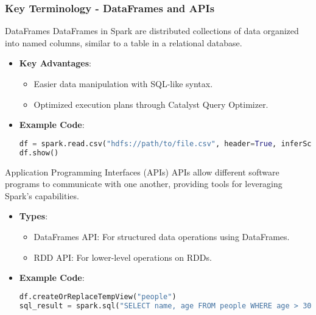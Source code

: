 \documentclass[aspectratio=169]{beamer}
\begin{document}
\begin{frame}[fragile]
    \frametitle{Key Terminology - DataFrames and APIs}
    \begin{block}{DataFrames}
        DataFrames in Spark are distributed collections of data organized into named columns, similar to a table in a relational database.
    \end{block}
    \pause
    \begin{itemize}
        \item \textbf{Key Advantages}:
        \begin{itemize}
            \item Easier data manipulation with SQL-like syntax.
            \item Optimized execution plans through Catalyst Query Optimizer.
        \end{itemize}
        \item \textbf{Example Code}:
        \begin{lstlisting}[language=Python]
df = spark.read.csv("hdfs://path/to/file.csv", header=True, inferSchema=True)
df.show()
        \end{lstlisting}
    \end{itemize}

    \begin{block}{Application Programming Interfaces (APIs)}
        APIs allow different software programs to communicate with one another, providing tools for leveraging Spark's capabilities.
    \end{block}
    \begin{itemize}
        \item \textbf{Types}:
        \begin{itemize}
            \item DataFrames API: For structured data operations using DataFrames.
            \item RDD API: For lower-level operations on RDDs.
        \end{itemize}
        \item \textbf{Example Code}:
        \begin{lstlisting}[language=Python]
df.createOrReplaceTempView("people")
sql_result = spark.sql("SELECT name, age FROM people WHERE age > 30")
        \end{lstlisting}
    \end{itemize}
\end{frame}
\end{document}
